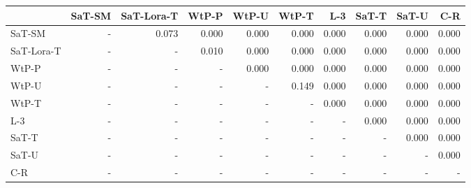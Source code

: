 \begin{tabular}{lrrrrrrrrr}
\toprule
 & SaT-SM & SaT-Lora-T & WtP-P & WtP-U & WtP-T & L-3 & SaT-T & SaT-U & C-R \\
\midrule
SaT-SM & - & 0.073 & 0.000 & 0.000 & 0.000 & 0.000 & 0.000 & 0.000 & 0.000 \\
SaT-Lora-T & - & - & 0.010 & 0.000 & 0.000 & 0.000 & 0.000 & 0.000 & 0.000 \\
WtP-P & - & - & - & 0.000 & 0.000 & 0.000 & 0.000 & 0.000 & 0.000 \\
WtP-U & - & - & - & - & 0.149 & 0.000 & 0.000 & 0.000 & 0.000 \\
WtP-T & - & - & - & - & - & 0.000 & 0.000 & 0.000 & 0.000 \\
L-3 & - & - & - & - & - & - & 0.000 & 0.000 & 0.000 \\
SaT-T & - & - & - & - & - & - & - & 0.000 & 0.000 \\
SaT-U & - & - & - & - & - & - & - & - & 0.000 \\
C-R & - & - & - & - & - & - & - & - & - \\
\bottomrule
\end{tabular}

